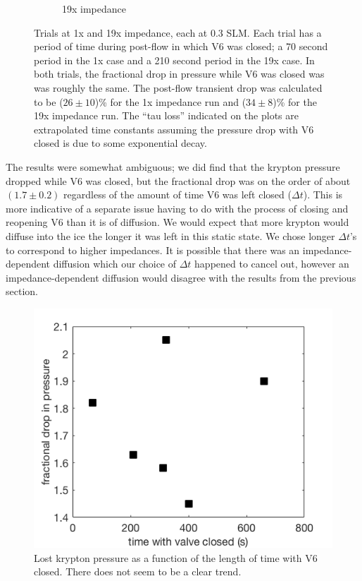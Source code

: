 \begin{figure}[h!]
\begin{subfigure}{0.5\textwidth}
  \caption{19x impedance}
  \label{fig:cyrano15x}
\end{subfigure}
\caption{Trials at 1x and 19x impedance, each at 0.3 SLM. Each trial has a period of time during post-flow in which V6 was closed; a 70 second period in the 1x case and a 210 second period in the 19x case. In both trials, the fractional drop in pressure while V6 was closed was was roughly the same. The post-flow transient drop was calculated to be ($26\pm10$)\% for the 1x impedance run and ($34\pm8$)\% for the 19x impedance run. The ``tau loss'' indicated on the plots are extrapolated time constants assuming the pressure drop with V6 closed is due to some exponential decay.} 
\label{fig:cyrano_trace}
\end{figure}

The results were somewhat ambiguous; we did find that the krypton pressure dropped while V6 was closed, but the fractional drop was on the order of about $(1.7\pm0.2)$ regardless of the amount of time V6 was left closed ($\Delta t$). This is more indicative of a separate issue having to do with the process of closing and reopening V6 than it is of diffusion. We would expect that more krypton would diffuse into the ice the longer it was left in this static state. We chose longer $\Delta t$'s to correspond to higher impedances. It is possible that there was an impedance-dependent diffusion which our choice of $\Delta t$ happened to cancel out, however an impedance-dependent diffusion would disagree with the results from the previous section.
\begin{figure}[h!]
\centering
\includegraphics[width=\textwidth]{Figures/diffusion_pdrop.png}
\caption{Lost krypton pressure as a function of the length of time with V6 closed. There does not seem to be a clear trend. }
\label{fig:closed_drop}
\end{figure}

